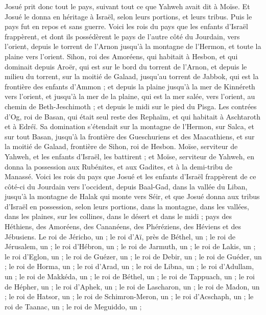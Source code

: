 \begin{multicols}{2}
Josué prit donc tout le pays, suivant tout ce que Yahweh avait dit à Moïse. Et Josué le donna en héritage à Israël, selon leurs portions, et leurs tribus. Puis le pays fut en repos et sans guerre.
\VerseOne{}Voici les rois du pays que les enfants d’Israël frappèrent, et dont ils possédèrent le pays de l’autre côté du Jourdain, vers l’orient, depuis le torrent de l’Arnon jusqu’à la montagne de l’Hermon, et toute la plaine vers l’orient.
Sihon, roi des Amoréens, qui habitait à Hesbon, et qui dominait depuis Aroër, qui est sur le bord du torrent de l’Arnon, et depuis le milieu du torrent, sur la moitié de Galaad, jusqu’au torrent de Jabbok, qui est la frontière des enfants d’Ammon ;
et depuis la plaine jusqu’à la mer de Kinnéreth vers l’orient, et jusqu’à la mer de la plaine, qui est la mer salée, vers l’orient, au chemin de Beth-Jeschimoth ; et depuis le midi sur le pied du Pisga.
Les contrées d’Og, roi de Basan, qui était seul reste des Rephaïm, et qui habitait à Aschtaroth et à Edréï.
Sa domination s’étendait sur la montagne de l’Hermon, sur Salca, et sur tout Basan, jusqu’à la frontière des Gueschuriens et des Maacathiens, et sur la moitié de Galaad, frontière de Sihon, roi de Hesbon.
Moïse, serviteur de Yahweh, et les enfants d’Israël, les battirent ; et Moïse, serviteur de Yahweh, en donna la possession aux Rubénites, et aux Gadites, et à la demi-tribu de Manassé.
Voici les rois du pays que Josué et les enfants d’Israël frappèrent de ce côté-ci du Jourdain vers l’occident, depuis Baal-Gad, dans la vallée du Liban, jusqu’à la montagne de Halak qui monte vers Séir, et que Josué donna aux tribus d’Israël en possession, selon leurs portions,
dans la montagne, dans les vallées, dans les plaines, sur les collines, dans le désert et dans le midi ; pays des Héthiens, des Amoréens, des Cananéens, des Phéréziens, des Héviens et des Jébusiens.
Le roi de Jéricho, un ; le roi d’Aï, près de Béthel, un ;
le roi de Jérusalem, un ; le roi d’Hébron, un ;
le roi de Jarmuth, un ; le roi de Lakis, un ;
le roi d’Eglon, un ; le roi de Guézer, un ;
le roi de Debir, un ; le roi de Guéder, un ;
le roi de Horma, un ; le roi d’Arad, un ;
le roi de Libna, un ; le roi d’Adullam, un ;
le roi de Makkéda, un ; le roi de Béthel, un ;
le roi de Tappuach, un ; le roi de Hépher, un ;
le roi d’Aphek, un ; le roi de Lascharon, un ;
le roi de Madon, un ; le roi de Hatsor, un ;
le roi de Schimron-Meron, un ; le roi d’Acschaph, un ;
le roi de Taanac, un ; le roi de Meguiddo, un ;

\end{multicols}
